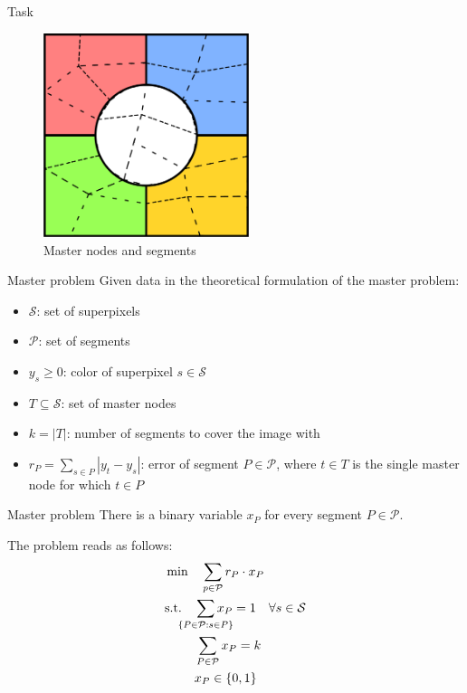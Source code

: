 \documentclass[fleqn]{beamer}
\newcommand{\superpixels}{\mathcal{S}}
\newcommand{\segments}{\mathcal{P}}
\begin{document}
    \begin{frame}{Task}
        \begin{figure}
            \begin{center}
                \includegraphics[width=60mm]{segments}
                \caption{Master nodes and segments}
            \end{center}
        \end{figure}
    \end{frame}	

    \begin{frame}{Master problem}
        Given data in the theoretical formulation of the master problem:
        \begin{itemize}
            \item $\superpixels$: set of superpixels
            \item $\segments$: set of segments %
            \item $y_s\geq0$: color of superpixel $s\in\superpixels$
            \item $T\subseteq\superpixels$: set of master nodes %
            \item $k=|T|$: number of segments to cover the image with
            \item $r_P=\sum_{s\in P}|y_t-y_s|$: error of segment $P\in\segments$,
            where $t\in T$ is the single master node for which $t\in P$
        \end{itemize}
    \end{frame}
	
	\begin{frame}{Master problem}
		There is a binary variable $x_P$ for every segment $P\in\segments$.
        
		The problem reads as follows:
		\begin{align}
    		&\min\quad \sum_{p\in\mathcal{P}} r_P\cdot x_P\\
		    &\text{s.t.}\quad \smashoperator{\sum_{\{P\in\mathcal{P}:s\in P\}}} x_P = 1 \quad\forall s\in\superpixels \\
		    &\phantom{\text{s.t.}\quad} \sum_{P\in\mathcal{P}} x_P = k \\
		    &\phantom{\text{s.t.}\quad} x_P \in \{0,1\}
		\end{align}
	\end{frame}
	
\end{document}
